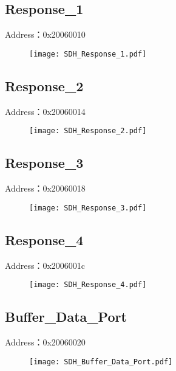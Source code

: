 \subsection{Response\_1}
\label{SDH-Response-1}
Address：0x20060010
 \begin{figure}[H]
\texttt{[image: SDH\_Response\_1.pdf]}
\end{figure}

\subsection{Response\_2}
\label{SDH-Response-2}
Address：0x20060014
 \begin{figure}[H]
\texttt{[image: SDH\_Response\_2.pdf]}
\end{figure}

\subsection{Response\_3}
\label{SDH-Response-3}
Address：0x20060018
 \begin{figure}[H]
\texttt{[image: SDH\_Response\_3.pdf]}
\end{figure}

\subsection{Response\_4}
\label{SDH-Response-4}
Address：0x2006001c
 \begin{figure}[H]
\texttt{[image: SDH\_Response\_4.pdf]}
\end{figure}

\subsection{Buffer\_Data\_Port}
\label{SDH-Buffer-Data-Port}
Address：0x20060020
 \begin{figure}[H]
\texttt{[image: SDH\_Buffer\_Data\_Port.pdf]}
\end{figure}


